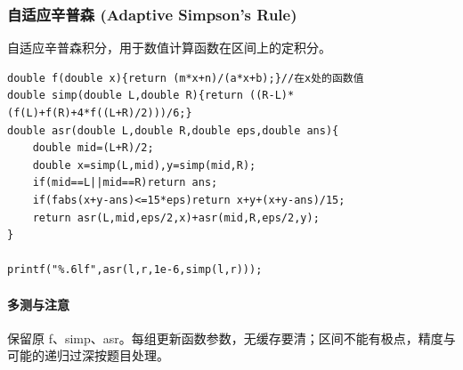 \subsubsection{自适应辛普森 (Adaptive Simpson's Rule)}
自适应辛普森积分，用于数值计算函数在区间上的定积分。
\begin{lstlisting}
double f(double x){return (m*x+n)/(a*x+b);}//在x处的函数值
double simp(double L,double R){return ((R-L)*(f(L)+f(R)+4*f((L+R)/2)))/6;}
double asr(double L,double R,double eps,double ans){
	double mid=(L+R)/2;
	double x=simp(L,mid),y=simp(mid,R);
	if(mid==L||mid==R)return ans;
	if(fabs(x+y-ans)<=15*eps)return x+y+(x+y-ans)/15;
	return asr(L,mid,eps/2,x)+asr(mid,R,eps/2,y);
}

printf("%.6lf",asr(l,r,1e-6,simp(l,r)));
\end{lstlisting}

\paragraph{多测与注意} 保留原 f、simp、asr。每组更新函数参数，无缓存要清；区间不能有极点，精度与可能的递归过深按题目处理。
